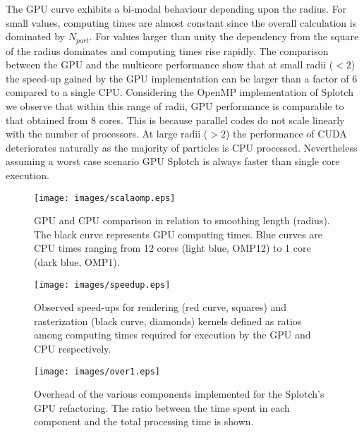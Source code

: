 \documentclass[1p]{elsarticle}
\begin{document}
The GPU curve exhibits a bi-modal behaviour depending upon the radius. For small values, computing times are almost constant since the overall calculation is dominated by $N_{part}$. For values larger than unity the dependency from the square of the radius dominates and computing times rise rapidly. The comparison between the GPU and the multicore performance show that at small radii ($< 2$) the speed-up gained by the GPU implementation can be larger than a factor of 6 compared to a single CPU. Considering the OpenMP implementation of Splotch we observe that within this range of radii, GPU performance is comparable to that obtained from 8 cores. This is because parallel codes do not scale linearly with the number of processors. At large radii ($> 2$) the performance of CUDA deteriorates naturally as the majority of particles is CPU processed. Nevertheless assuming a worst case scenario GPU Splotch is always faster than single core execution. 

\begin{figure}
\centering
\texttt{[image: images/scalaomp.eps]}
\caption{GPU and CPU comparison in relation to smoothing length (radius). The black curve represents GPU computing times. Blue curves are CPU times ranging from 12 cores (light blue, OMP12) to 1 core (dark blue, OMP1).}
\label{fig:gpucpu}
\end{figure}

\begin{figure}
\centering
\texttt{[image: images/speedup.eps]}
\caption{
Observed speed-ups for rendering (red curve, squares) and rasterization (black curve, diamonds) kernels defined as ratios among computing times required for execution by the GPU and CPU respectively.
}
\label{fig:speedup}
\end{figure}

\begin{figure}
\centering
\texttt{[image: images/over1.eps]}
\caption{Overhead of the various components implemented for the Splotch's
GPU refactoring. The ratio between the time spent in each component and the total processing 
time is shown.}
\label{fig:over}
\end{figure}
\end{document}
